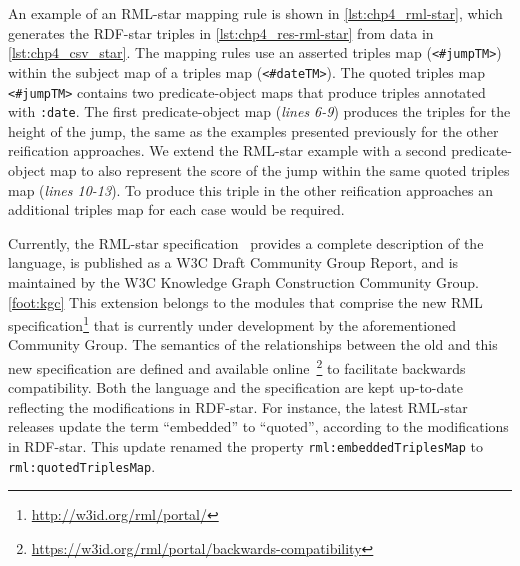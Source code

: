 An example of an \mbox{RML-star} mapping rule is shown in \cref{lst:chp4_rml-star}, which generates the \mbox{RDF-star} triples in \cref{lst:chp4_res-rml-star} from data in \cref{lst:chp4_csv_star}. 
The mapping rules use an asserted triples map (\texttt{<\#jumpTM>}) within the subject map of a triples map (\texttt{<\#dateTM>}). The quoted triples map \texttt{<\#jumpTM>} contains two predicate-object maps that produce triples annotated with \texttt{:date}. The first predicate-object map (\textit{lines 6-9}) produces the triples for the height of the jump, the same as the examples presented previously for the other reification approaches. We extend the RML-star example with a second predicate-object map to also represent the score of the jump within the same quoted triples map (\textit{lines 10-13}). To produce this triple in the other reification approaches an additional triples map for each case would be required.


Currently, the \mbox{RML-star} specification~\citep{iglesias2022rmlstar} provides a complete description of the language, is published as a W3C Draft Community Group Report, and is maintained by the W3C Knowledge Graph Construction Community Group.\cref{foot:kgc} 
This extension belongs to the modules that comprise the new RML specification\footnote{\label{foot:rml-portal}\url{http://w3id.org/rml/portal/}} that is currently under development by the aforementioned Community Group. The semantics of the relationships between the old and this new specification are defined and available online~\footnote{\url{https://w3id.org/rml/portal/backwards-compatibility}} to facilitate backwards compatibility.
Both the language and the specification are kept up-to-date reflecting the modifications in \mbox{RDF-star}.
For instance, the latest \mbox{RML-star} releases update the term ``embedded'' to ``quoted'',
according to the modifications in \mbox{RDF-star}.
This update renamed the property \texttt{rml:embeddedTriplesMap} to \texttt{rml:quotedTriplesMap}.



